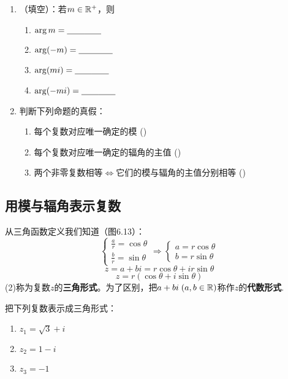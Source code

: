 \begin{ex}
\begin{enumerate}
\item   （填空）：若$m\in\mathbb{R}^+$，则
\begin{multicols}{2}
\begin{enumerate}[(1)]
    \item $\arg m=\underline{\qquad}\underline{\qquad}$
    \item $\arg(-m)=\underline{\qquad}\underline{\qquad}$
    \item $\arg(mi)=\underline{\qquad}\underline{\qquad}$
    \item $\arg(-mi)=\underline{\qquad}\underline{\qquad}$
\end{enumerate}
\end{multicols}


\item 判断下列命题的真假：
\begin{enumerate}[(1)]
\item 每个复数对应唯一确定的模\hfill
(\quad)
\item 每个复数对应唯一确定的辐角的主值\hfill
(\quad)
\item 两个非零复数相等$\Leftrightarrow$它们的模与辐角的主值分别相等\hfill
(\quad)
\end{enumerate}

\end{enumerate}

\end{ex}


\subsection{用模与辐角表示复数}

从三角函数定义我们知道（图6.13）：
\[\begin{cases}
    \frac{a}{r}=\cos \theta\\
    \frac{b}{r}=\sin\theta
\end{cases}\Rightarrow \begin{cases}
    a=r\cos\theta\\
    b=r\sin\theta
\end{cases}\]
\[z=a+bi=r\cos\theta+ir\sin\theta\]
\begin{equation}
  z=r(\cos\theta+i\sin\theta)\tag{2}
\end{equation}
(2)称为复数$z$的\textbf{三角形式}。为了区别，把$a+bi\; (a,b\in\mathbb{R})$称作$z$的\textbf{代数形式}.

\begin{example}
    把下列复数表示成三角形式：
\begin{multicols}{3}
\begin{enumerate}[(1)]
    \item $z_1=\sqrt{3}+i$
    \item $z_2=1-i$
    \item $z_3=-1$
\end{enumerate}
\end{multicols}
\end{example}

